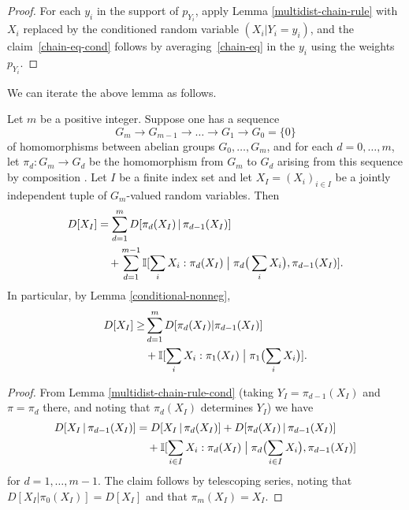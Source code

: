   \begin{proof}
  For each $y_i$ in the support of $p_{Y_i}$, apply Lemma \ref{multidist-chain-rule} with $X_i$ replaced by the conditioned random variable $(X_i|Y_i=y_i)$, and the claim~\eqref{chain-eq-cond} follows by averaging~\eqref{chain-eq} in the $y_i$ using the weights $p_{Y_i}$.
  \end{proof}

  We can iterate the above lemma as follows.

  \begin{lemma}\label{multidist-chain-rule-iter}  Let $m$ be a positive integer.
    Suppose one has a sequence
    \begin{equation}\label{g-seq}
      G_m \to G_{m-1} \to \dots \to G_1 \to G_0 = \{0\}
    \end{equation}
    of homomorphisms between abelian groups $G_0,\dots,G_m$, and for each $d=0,\dots,m$, let $\pi_d : G_m \to G_d$ be the homomorphism from $G_m$ to $G_d$ arising from this sequence by composition .
    Let $I$ be a finite index set and let $X_{I} = (X_i)_{i \in I}$ be a jointly independent tuple of $G_m$-valued random variables.
    Then
    \begin{equation}
      \begin{split}
        D[ X_{I} ] &=  \sum_{d=1}^m D[ \pi_d(X_{I}) \,|\, \pi_{d-1}(X_{I})] \\
         &\quad + \sum_{d=1}^{m-1} \mathbb{I}[ \sum_i X_i : \pi_d(X_{I}) \; \big| \; \pi_d\big(\sum_i X_i\big), \pi_{d-1}(X_{I}) ].
      \end{split}\label{chain-eq-cond'}
    \end{equation}
    In particular, by Lemma \ref{conditional-nonneg},
    \begin{align}\nonumber
        D[ X_{I} ] \geq  & \sum_{d=1}^m D[ \pi_d(X_{I})|\pi_{d-1}(X_{I}) ] \\
         & + \mathbb{I}[ \sum_i X_i : \pi_1(X_{I}) \; \big| \; \pi_1\bigl(\sum_i X_i\bigr) ].\label{chain-eq-cond''}
    \end{align}
  \end{lemma}

  \begin{proof}
  From Lemma \ref{multidist-chain-rule-cond} (taking $Y_I = \pi_{d-1}(X_I)$ and $\pi = \pi_d$ there, and noting that $\pi_d(X_I)$ determines $Y_I$) we have
  \begin{align*}
    D[ X_{I} \,|\, \pi_{d-1}(X_{I}) ] &=  D[ X_{I} \,|\, \pi_d(X_{I}) ] + D[  \pi_d(X_{I})\,|\,\pi_{d-1}(X_{I}) ] \\
                                             &\quad + \mathbb{I}[ \sum_{i \in I} X_i : \pi_d(X_{I}) \; \big| \; \pi_d\bigl(\sum_{i \in I} X_i\bigr), \pi_{d-1}(X_{I}) ]
  \end{align*}
  for $d=1,\dots,m-1$. The claim follows by telescoping series, noting that $D[X_I | \pi_0(X_I)] = D[X_I]$ and that $\pi_m(X_I)=X_I$.
  \end{proof}

